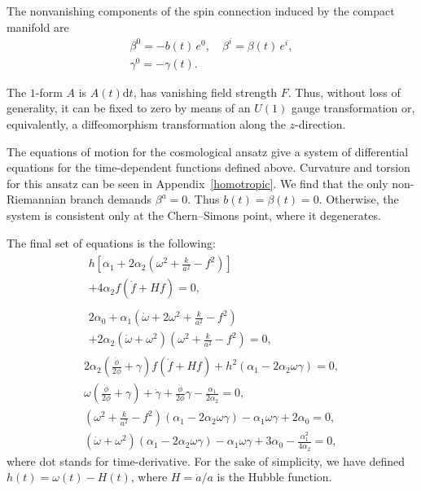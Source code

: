 \documentclass[aps,prd,12pt,superscriptaddress,showpacs,showkeys,longbibliography,reprint,nofootinbib]{revtex4-1}
\begin{document}
The nonvanishing components of the spin connection induced by the compact manifold are
\begin{gather}
  \beta^0 = -b(t) \, e^0,\quad \beta^i = \beta(t) \, e^i,\\
  \label{gamma cosmo}
  \gamma^0 =-\gamma(t).
\end{gather}

The $1$-form $A$ is $A(t)\text{d}t$, has vanishing field strength $F$. Thus, without loss of generality, it can be fixed to zero by means of an $U(1)$ gauge transformation or, equivalently, a diffeomorphism transformation along the $z$-direction.

The equations of motion for the cosmological ansatz give a system of differential equations for the time-dependent functions defined above. Curvature and torsion for this ansatz can be seen in Appendix~\ref{homotropic}. We find that the only non-Riemannian branch demands  $\beta^a=0$. Thus $b(t)=\beta(t)=0$. Otherwise, the system is consistent only at the Chern--Simons point, where it degenerates. 

The final set of equations is the following:
\setlength\multlinegap{0pt}
\begin{gather}
  \label{eqn1}
  \begin{multlined}
    h\left[\alpha_1+2\alpha_2\left(\omega^2+\frac{k}{a^2}-f^2\right)\right] \\
    +4\alpha_2f\left(\dot{f}+Hf\right)=0,
  \end{multlined}
  \\
  \begin{multlined}
    2\alpha_0+\alpha_1\left(\dot{\omega}+2\omega^2+\frac{k}{a^2}-f^2\right)\\
    +2\alpha_2\left(\dot{\omega}+\omega^2\right)\left(\omega^2+\frac{k}{a^2}-f^2\right)=0,
  \end{multlined}
  \\
  2\alpha_2\left(\tfrac{\dot{\phi}}{2\phi}+\gamma\right)f\left(\dot{f}+Hf\right)
  +h^2\left(\alpha_1-2\alpha_2\omega\gamma\right)=0,
  \\
  \omega\left(\frac{\dot{\phi}}{2\phi}+\gamma\right)+\dot{\gamma}+\frac{\dot{\phi}}{2\phi}\gamma-\frac{\alpha_1}{2\alpha_2}=0,
  \\
  \left(\omega^2+\tfrac{k}{a^2}-f^2\right)\left(\alpha_1-2\alpha_2\omega\gamma\right)-\alpha_1\omega\gamma+2\alpha_0=0,
  \\
  \label{eqn2}
  \left(\dot{\omega}+\omega^2\right)\left(\alpha_1-2\alpha_2\omega\gamma\right)-\alpha_1
  \omega\gamma+3\alpha_0 - \frac{\alpha^2_1}{4\alpha_2}=0,
\end{gather}
where dot stands for time-derivative. For the sake of simplicity, we have defined $h(t)=\omega(t)-H(t)$, where $H=\dot{a}/a$ is the Hubble function.
\end{document}
